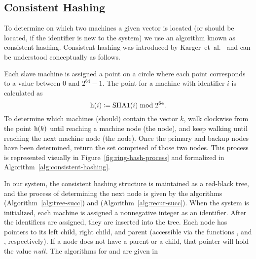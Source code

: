 \subsection{Consistent Hashing}
To determine on which two machines a given vector is located (or should be
located, if the identifier is new to the system) we use an algorithm known as
consistent hashing. Consistent hashing was introduced by
Karger~et~al.~\cite{karger1997} and can be understood conceptually as follows.
\par
Each slave machine is assigned a point on a circle where each point corresponds
to a value between \(0\) and \(2^{64} - 1\). The point for a machine with
identifier \(i\) is calculated as
\begin{equation*}
    \mathrm{h}(i) \coloneqq \mathrm{SHA1}(i) \bmod{2^{64}}.
\end{equation*}
To determine which machines (should) contain the vector \(k\), walk clockwise
from the point \(\mathrm{h}(k)\) until reaching a machine node (the
 node), and keep walking until reaching the next machine node
(the  node). Once the primary and backup nodes have been
determined, return the set comprised of those two nodes. This process is
represented visually in Figure~\ref{fig:ring-hash-process} and formalized in
Algorithm~\ref{alg:consistent-hashing}.
%
\par
In our system, the consistent hashing structure is maintained as a red-black
tree, and the process of determining the next node is given by the algorithms
 (Algorithm~\ref{alg:tree-succ}) and
 (Algorithm~\ref{alg:recur-succ}). When the system is
initialized, each machine is assigned a nonnegative integer as an identifier.
After the identifiers are assigned, they are inserted into the tree. Each node
has pointers to its left child, right child, and parent (accessible via the
functions ,  and ,
respectively). If a node does not have a parent or a child, that pointer will
hold the value \(null\). The algorithms for  and
 are given in \cite{cormen2009}
%
